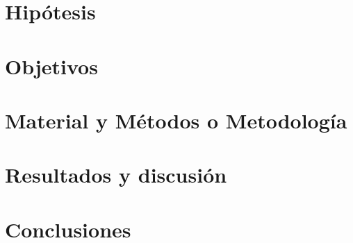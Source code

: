 \documentclass[12pt, letterpaper, spanish, twoside]{article}
\begin{document}
\section{Hipótesis}


\section{Objetivos}


\section{Material y Métodos o Metodología}


\section{Resultados y discusión}


\section{Conclusiones}




\nocite{*} %
\renewcommand{\refname}{Referencias bibliográficas}



\end{document}
